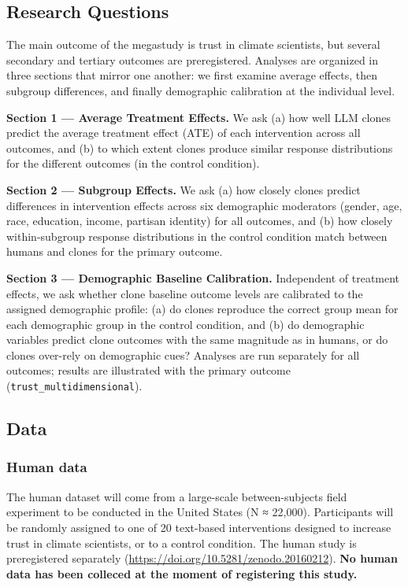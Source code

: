 \documentclass[
  letterpaper,
  DIV=11,
  numbers=noendperiod]{scrartcl}
\begin{document}
\subsection{Research Questions}\label{research-questions}

The main outcome of the megastudy is trust in climate scientists, but
several secondary and tertiary outcomes are preregistered. Analyses are
organized in three sections that mirror one another: we first examine
average effects, then subgroup differences, and finally demographic
calibration at the individual level.

\textbf{Section 1 --- Average Treatment Effects.} We ask (a) how well
LLM clones predict the average treatment effect (ATE) of each
intervention across all outcomes, and (b) to which extent clones produce
similar response distributions for the different outcomes (in the
control condition).

\textbf{Section 2 --- Subgroup Effects.} We ask (a) how closely clones
predict differences in intervention effects across six demographic
moderators (gender, age, race, education, income, partisan identity) for
all outcomes, and (b) how closely within-subgroup response distributions
in the control condition match between humans and clones for the primary
outcome.

\textbf{Section 3 --- Demographic Baseline Calibration.} Independent of
treatment effects, we ask whether clone baseline outcome levels are
calibrated to the assigned demographic profile: (a) do clones reproduce
the correct group mean for each demographic group in the control
condition, and (b) do demographic variables predict clone outcomes with
the same magnitude as in humans, or do clones over-rely on demographic
cues? Analyses are run separately for all outcomes; results are
illustrated with the primary outcome (\texttt{trust\_multidimensional}).

\subsection{Data}\label{data}

\subsubsection{Human data}\label{human-data}

The human dataset will come from a large-scale between-subjects field
experiment to be conducted in the United States (N ≈ 22,000).
Participants will be randomly assigned to one of 20 text-based
interventions designed to increase trust in climate scientists, or to a
control condition. The human study is preregistered separately
(\url{https://doi.org/10.5281/zenodo.20160212}). \textbf{No human data
has been colleced at the moment of registering this study.}
\end{document}
